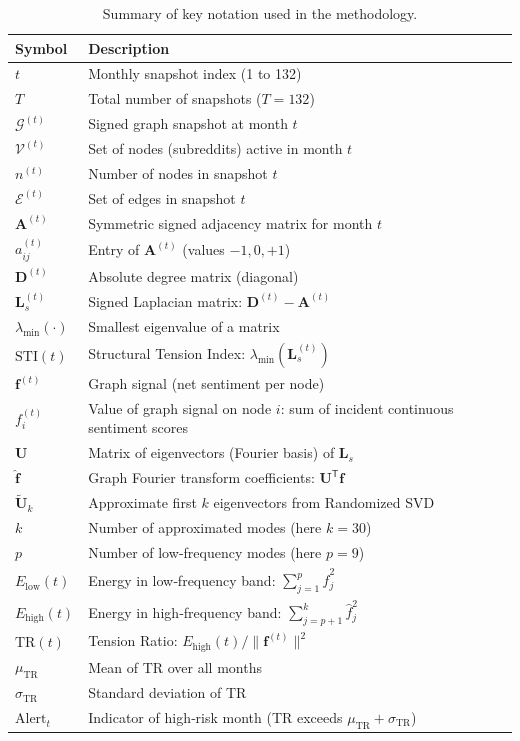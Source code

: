 \documentclass[a4paper,fleqn]{cas-dc}
\begin{document}
\begin{table}[h!]
\centering
\caption{Summary of key notation used in the methodology.}
\label{tab:notation}
\begin{tabular}{@{}p{1.5cm}p{6.5cm}@{}}
\toprule
\textbf{Symbol} & \textbf{Description} \\ 
\midrule
\(t\)           & Monthly snapshot index (1 to 132) \\
\(T\)           & Total number of snapshots (\(T=132\)) \\
\(\mathcal{G}^{(t)}\) & Signed graph snapshot at month \(t\) \\
\(\mathcal{V}^{(t)}\) & Set of nodes (subreddits) active in month \(t\) \\
\(n^{(t)}\)     & Number of nodes in snapshot \(t\) \\
\(\mathcal{E}^{(t)}\) & Set of edges in snapshot \(t\) \\
\(\mathbf{A}^{(t)}\) & Symmetric signed adjacency matrix for month \(t\) \\
\(a_{ij}^{(t)}\) & Entry of \(\mathbf{A}^{(t)}\) (values \(-1,0,+1\)) \\
\(\mathbf{D}^{(t)}\) & Absolute degree matrix (diagonal) \\
\(\mathbf{L}_s^{(t)}\) & Signed Laplacian matrix: \(\mathbf{D}^{(t)} - \mathbf{A}^{(t)}\) \\
\(\lambda_{\min}(\cdot)\) & Smallest eigenvalue of a matrix \\
\(\text{STI}(t)\) & Structural Tension Index: \(\lambda_{\min}(\mathbf{L}_s^{(t)})\) \\
\(\mathbf{f}^{(t)}\) & Graph signal (net sentiment per node) \\
\(f_i^{(t)}\)    & Value of graph signal on node \(i\): sum of incident continuous sentiment scores \\
\(\mathbf{U}\)   & Matrix of eigenvectors (Fourier basis) of \(\mathbf{L}_s\) \\
\(\hat{\mathbf{f}}\) & Graph Fourier transform coefficients: \(\mathbf{U}^\mathsf{T}\mathbf{f}\) \\
\(\tilde{\mathbf{U}}_k\) & Approximate first \(k\) eigenvectors from Randomized SVD \\
\(k\)           & Number of approximated modes (here \(k=30\)) \\
\(p\)           & Number of low‑frequency modes (here \(p=9\)) \\
\(E_{\text{low}}(t)\) & Energy in low‑frequency band: \(\sum_{j=1}^{p} \hat{f}_j^2\) \\
\(E_{\text{high}}(t)\) & Energy in high‑frequency band: \(\sum_{j=p+1}^{k} \hat{f}_j^2\) \\
\(\text{TR}(t)\) & Tension Ratio: \(E_{\text{high}}(t) / \|\mathbf{f}^{(t)}\|^2\) \\
\(\mu_{\text{TR}}\) & Mean of TR over all months \\
\(\sigma_{\text{TR}}\) & Standard deviation of TR \\
\(\text{Alert}_t\) & Indicator of high‑risk month (TR exceeds \(\mu_{\text{TR}}+\sigma_{\text{TR}}\)) \\
\bottomrule
\end{tabular}
\end{table}
\end{document}
